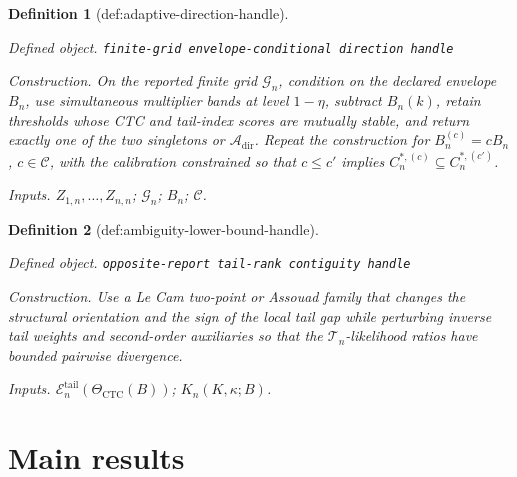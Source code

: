 \documentclass{article}
\newtheorem{definition}{Definition}
\begin{document}
\begin{definition}[def:adaptive-direction-handle]\label{def:adaptive-direction-handle}
\par\smallskip\noindent\emph{Defined object.} \texttt{finite-\allowbreak{}grid envelope-\allowbreak{}conditional direction handle}
\par\smallskip\noindent\emph{Construction.} On the reported finite grid \(\mathcal G_n\), condition on the declared envelope \(B_n\), use simultaneous multiplier bands at level \(1-\eta\), subtract \(B_n(k)\), retain thresholds whose CTC and tail-index scores are mutually stable, and return exactly one of the two singletons or \(\mathcal A_{\mathrm{dir}}\). Repeat the construction for \(B_n^{(c)}=cB_n\), \(c\in\mathcal C\), with the calibration constrained so that \(c\leq c'\) implies \(C_n^{*,(c)}\subseteq C_n^{*,(c')}\).
\par\smallskip\noindent\emph{Inputs.} \(Z_{1,n},\ldots,Z_{n,n}\); \(\mathcal G_n\); \(B_n\); \(\mathcal C\).
\end{definition}

\begin{definition}[def:ambiguity-lower-bound-handle]\label{def:ambiguity-lower-bound-handle}
\par\smallskip\noindent\emph{Defined object.} \texttt{opposite-\allowbreak{}report tail-\allowbreak{}rank contiguity handle}
\par\smallskip\noindent\emph{Construction.} Use a Le Cam two-point or Assouad family that changes the structural orientation and the sign of the local tail gap while perturbing inverse tail weights and second-order auxiliaries so that the \(\mathcal T_n\)-likelihood ratios have bounded pairwise divergence.
\par\smallskip\noindent\emph{Inputs.} \(\mathcal E_n^{\mathrm{tail}}(\Theta_{\mathrm{CTC}}(B))\); \(K_n(K,\kappa;B)\).
\end{definition}

\section{Main results}
\end{document}
